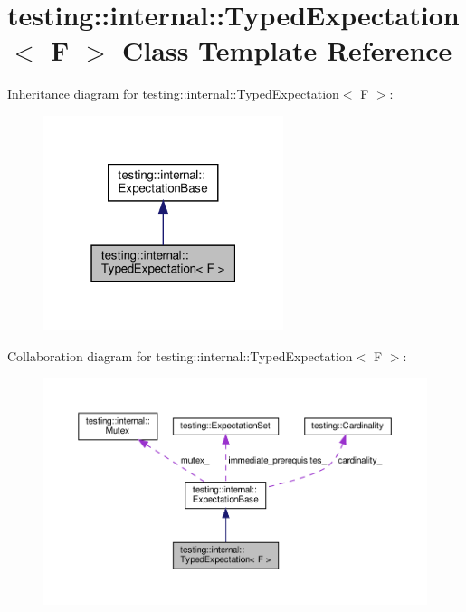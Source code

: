 \hypertarget{classtesting_1_1internal_1_1_typed_expectation}{}\section{testing\+:\+:internal\+:\+:Typed\+Expectation$<$ F $>$ Class Template Reference}
\label{classtesting_1_1internal_1_1_typed_expectation}


Inheritance diagram for testing\+:\+:internal\+:\+:Typed\+Expectation$<$ F $>$\+:
\nopagebreak
\begin{figure}[H]
\begin{center}
\leavevmode
\includegraphics[width=199pt]{classtesting_1_1internal_1_1_typed_expectation__inherit__graph}
\end{center}
\end{figure}


Collaboration diagram for testing\+:\+:internal\+:\+:Typed\+Expectation$<$ F $>$\+:
\nopagebreak
\begin{figure}[H]
\begin{center}
\leavevmode
\includegraphics[width=350pt]{classtesting_1_1internal_1_1_typed_expectation__coll__graph}
\end{center}
\end{figure}

